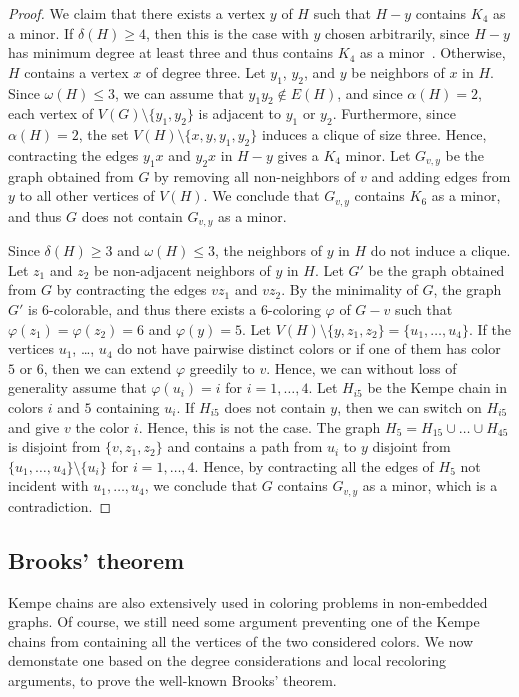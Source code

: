 \documentclass[12pt,twoside,openright,a4paper]{book}
\begin{document}
\begin{proof}
We claim that there exists a vertex $y$ of $H$ such that $H-y$ contains $K_4$ as a minor.
If $\delta(H)\ge 4$, then this is the case with $y$ chosen arbitrarily, since $H-y$ has minimum degree at least three and thus contains $K_4$ as a minor~\cite{dirac}.
Otherwise, $H$ contains a vertex $x$ of degree three.  Let $y_1$, $y_2$, and $y$ be neighbors of $x$ in $H$.  Since $\omega(H)\le 3$, we can assume
that $y_1y_2\not\in E(H)$, and since $\alpha(H)=2$, each vertex of $V(G)\setminus\{y_1,y_2\}$ is adjacent to $y_1$ or $y_2$.
Furthermore, since $\alpha(H)=2$, the set $V(H)\setminus\{x,y,y_1,y_2\}$ induces a clique of size three.  Hence, contracting the edges $y_1x$ and $y_2x$ in $H-y$ gives
a $K_4$ minor.  Let $G_{v,y}$ be the graph obtained from $G$ by removing all non-neighbors of $v$ and adding edges from $y$ to all other vertices of $V(H)$.
We conclude that $G_{v,y}$ contains $K_6$ as a minor, and thus $G$ does not contain $G_{v,y}$ as a minor.

Since $\delta(H)\ge 3$ and $\omega(H)\le 3$, the neighbors of $y$ in $H$ do not induce a clique.  Let $z_1$ and $z_2$ be non-adjacent neighbors of $y$ in $H$.
Let $G'$ be the graph obtained from $G$ by contracting the edges $vz_1$ and $vz_2$.  By the minimality of $G$, the graph $G'$ is $6$-colorable,
and thus there exists a $6$-coloring $\varphi$ of $G-v$ such that $\varphi(z_1)=\varphi(z_2)=6$ and $\varphi(y)=5$.  Let $V(H)\setminus\{y,z_1,z_2\}=\{u_1,\ldots,u_4\}$.
If the vertices $u_1$, \ldots, $u_4$ do not have pairwise distinct colors or if one of them has color $5$ or $6$, then we can extend $\varphi$ greedily to $v$.
Hence, we can without loss of generality assume that $\varphi(u_i)=i$ for $i=1, \ldots, 4$.  Let $H_{i5}$ be the Kempe chain in colors $i$ and $5$ containing $u_i$.
If $H_{i5}$ does not contain $y$, then we can switch on $H_{i5}$ and give $v$ the color $i$.  Hence, this is not the case.
The graph $H_5=H_{15}\cup\ldots\cup H_{45}$ is disjoint from $\{v,z_1,z_2\}$ and contains a path from $u_i$ to $y$ disjoint from $\{u_1,\ldots,u_4\}\setminus \{u_i\}$
for $i=1, \ldots, 4$.  Hence, by contracting all the edges of $H_5$ not incident with $u_1, \ldots, u_4$, we conclude that $G$ contains $G_{v,y}$ as a minor,
which is a contradiction.
\end{proof}

\subsection{Brooks' theorem}

Kempe chains are also extensively used in coloring problems in non-embedded graphs.
Of course, we still need some argument preventing one of the Kempe chains from containing
all the vertices of the two considered colors.  We now demonstate one based on the
degree considerations and local recoloring arguments, to prove the well-known Brooks' theorem.
\end{document}
